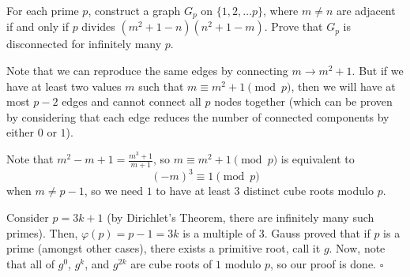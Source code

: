 
\begin{problem}[ISL 2020 N2]
    For each prime $p$, construct a graph $G_p$ on $\{1,2,\ldots p\}$, where
    $m \neq n$ are adjacent if and only if $p$ divides $(m^2+1-n)(n^2+1-m)$.
    Prove that $G_p$ is disconnected for infinitely many $p$.
\end{problem}

\begin{solution}[Ritwin]
    Note that we can reproduce the same edges by connecting $m \rightarrow m^2+1$.
    But if we have at least two values $m$ such that $m \equiv m^2+1 \pmod p$,
    then we will have at most $p-2$ edges and cannot connect all $p$ nodes
    together (which can be proven by considering that each edge reduces the
    number of connected components by either $0$ or $1$).
    
    Note that $m^2-m+1 = \tfrac{m^3+1}{m+1}$, so $m \equiv m^2+1 \pmod p$ is
    equivalent to \[(-m)^3 \equiv 1 \pmod p\] when $m \neq p-1$, so we need
    $1$ to have at least $3$ distinct cube roots modulo $p$.
    
    Consider $p = 3k+1$ (by Dirichlet's Theorem, there are infinitely many such
    primes). Then, $\varphi(p) = p-1 = 3k$ is a multiple of $3$. Gauss proved
    that if $p$ is a prime (amongst other cases), there exists a primitive root,
    call it $g$. Now, note that all of $g^0$, $g^k$, and $g^{2k}$ are cube roots
    of $1$ modulo $p$, so our proof is done. $\square$
\end{solution}
